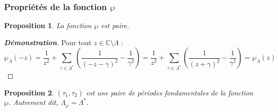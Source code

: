 \documentclass[12pt]{article}
\newtheorem{proposition}{Proposition}
\begin{document}
            \subsubsection{Propriétés de la fonction \(\wp\)}
            
            \begin{proposition}
            La fonction \(\wp\) est paire.
            \end{proposition}
            
            \begin{proof}[\textbf{Démonstration}] 
            Pour tout \(z \in \mathbb{C} \setminus \Lambda\) :
            \[
            \wp_\Lambda(-z) = \frac{1}{z^2} + \sum_{\gamma \in \Lambda^*} \left( \frac{1}{(-z - \gamma)^2} - \frac{1}{\gamma^2} \right)
            = \frac{1}{z^2} + \sum_{\gamma \in \Lambda^*} \left( \frac{1}{(z + \gamma)^2} - \frac{1}{\gamma^2} \right)
            = \wp_\Lambda(z)
            \]
            \end{proof}
            
            \begin{proposition}
            \((\tau_1, \tau_2)\) est une paire de périodes fondamentales de la fonction \(\wp\). Autrement dit, \(\Lambda_{\wp} = \Lambda^*\).
            \end{proposition}
            
\end{document}
